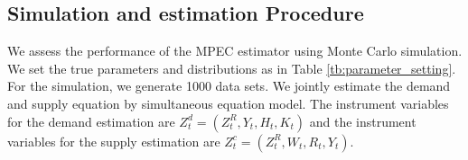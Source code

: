 \documentclass[11pt, a4paper]{article}
\begin{document}
\subsection{Simulation and estimation Procedure}

We assess the performance of the MPEC estimator using Monte Carlo simulation.
We set the true parameters and distributions as in Table \ref{tb:parameter_setting}. 
For the simulation, we generate 1000 data sets. We jointly estimate the demand and supply equation by simultaneous equation model.
The instrument variables for the demand estimation are $Z^{d}_{t} = (Z^{R}_{t}, Y_t, H_{t}, K_{t})$ and the instrument variables for the supply estimation are $Z^{c}_{t} = (Z^{R}_{t}, W_{t}, R_t, Y_t)$. 


\begin{table}[!htbp]
    \caption{True parameters and distributions}
    \label{tb:parameter_setting}
    \begin{center}
\end{center}
\end{table}
\end{document}
